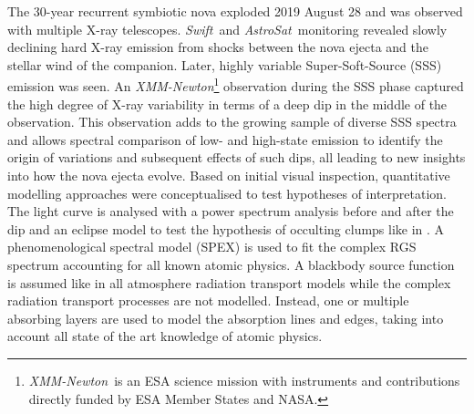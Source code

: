 \documentclass{aa}
\newcommand{\swift}{{\it Swift}}
\newcommand{\xmm}{{\it XMM-Newton}}
\newcommand{\asat}{{\it AstroSat}}
\begin{document}
  \abstract
{
The 30-year recurrent symbiotic nova  exploded 2019 August 28
and was observed with multiple X-ray telescopes. \swift\ and \asat\
monitoring revealed slowly declining hard X-ray emission from
shocks between the nova ejecta and the stellar wind of the companion.
Later, highly variable Super-Soft-Source (SSS) emission was seen.
An \xmm\thanks{\xmm\ is an ESA science mission with
   instruments and
   contributions directly funded by ESA Member States and NASA.}
observation during the SSS phase captured the high degree of X-ray
variability in terms of a deep dip in the middle of the observation.
}
{
This observation adds to the growing sample of diverse SSS
spectra and allows spectral comparison of low- and high-state emission
to identify the origin of variations and subsequent effects of such
dips, all leading to new insights into how the nova ejecta evolve.
}
{
Based on initial visual inspection, quantitative modelling approaches
were conceptualised to test hypotheses of interpretation. The light
curve is analysed with a power spectrum analysis before and after
the dip and an eclipse model to test the hypothesis of occulting
clumps like in \object{U Sco}. A phenomenological spectral model (SPEX) is used to
fit the complex RGS spectrum accounting for all known atomic physics.
A blackbody source function is assumed like in all atmosphere radiation
transport models while the complex radiation transport processes are
not modelled. Instead, one or multiple absorbing layers are used to model
the absorption lines and edges, taking into account all state of the art
knowledge of atomic physics.
   }
\end{document}
